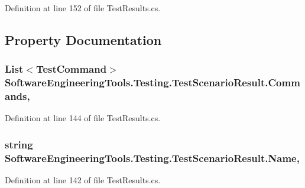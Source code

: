 Definition at line 152 of file Test\+Results.\+cs.



\subsection{Property Documentation}
\hypertarget{class_software_engineering_tools_1_1_testing_1_1_test_scenario_result_a58554b141c207282fcd65b8b50534a99}{
\subsubsection[{Commands}]{\setlength{\rightskip}{0pt plus 5cm}List$<${\bf Test\+Command}$>$ Software\+Engineering\+Tools.\+Testing.\+Test\+Scenario\+Result.\+Commands\hspace{0.3cm}{\ttfamily [get]}, {\ttfamily [set]}}}\label{class_software_engineering_tools_1_1_testing_1_1_test_scenario_result_a58554b141c207282fcd65b8b50534a99}


Definition at line 144 of file Test\+Results.\+cs.

\hypertarget{class_software_engineering_tools_1_1_testing_1_1_test_scenario_result_a60b47271609a2aa0a0eb3021a5ebb988}{
\subsubsection[{Name}]{\setlength{\rightskip}{0pt plus 5cm}string Software\+Engineering\+Tools.\+Testing.\+Test\+Scenario\+Result.\+Name\hspace{0.3cm}{\ttfamily [get]}, {\ttfamily [set]}}}\label{class_software_engineering_tools_1_1_testing_1_1_test_scenario_result_a60b47271609a2aa0a0eb3021a5ebb988}


Definition at line 142 of file Test\+Results.\+cs.

